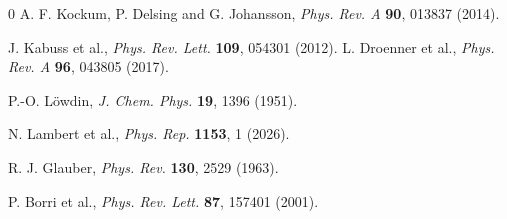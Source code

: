 \documentclass{ws-ijmpb}
\begin{document}
\begin{thebibliography}{0}
	A. F. Kockum, P. Delsing and G. Johansson, {\it Phys. Rev. A} {\bf90}, 013837 (2014).
	
	J. Kabuss et al., {\it Phys. Rev. Lett.} {\bf109}, 054301 (2012).
	L. Droenner et al., {\it Phys. Rev. A} {\bf96}, 043805 (2017).
	
	P.-O. L\"owdin, {\it J. Chem. Phys.} {\bf19}, 1396 (1951).
	
	N. Lambert et al., {\it Phys. Rep.} {\bf1153}, 1 (2026).
	
	R. J. Glauber, {\it Phys. Rev.} {\bf130}, 2529 (1963).
	
	P. Borri et al., {\it Phys. Rev. Lett.} {\bf87}, 157401 (2001).
	
\end{thebibliography}
\end{document}
